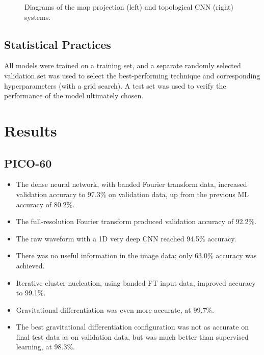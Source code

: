 \documentclass[12pt]{article}
\begin{document}
\begin{figure}[ht]
    \centering
    \qquad
    \caption{Diagrams of the map projection (left) and topological CNN (right) systems.}
\end{figure}

\subsection{Statistical Practices}

All models were trained on a training set, and a separate randomly selected validation set was used to select the best-performing technique and corresponding hyperparameters (with a grid search). A test set was used to verify the performance of the model ultimately chosen.

\section{Results}

\subsection{PICO-60}

\begin{itemize}
    \item The dense neural network, with banded Fourier transform data, increased validation accuracy to 97.3\% on validation data, up from the previous ML accuracy of 80.2\%.
    \item The full-resolution Fourier transform produced validation accuracy of 92.2\%.
    \item The raw waveform with a 1D very deep CNN reached 94.5\% accuracy.
    \item There was no useful information in the image data; only 63.0\% accuracy was achieved.
    \item Iterative cluster nucleation, using banded FT input data, improved accuracy to 99.1\%.
    \item Gravitational differentiation was even more accurate, at 99.7\%.
    \item The best gravitational differentiation configuration was not as accurate on final test data as on validation data, but was much better than supervised learning, at 98.3\%.
\end{itemize}
\end{document}
